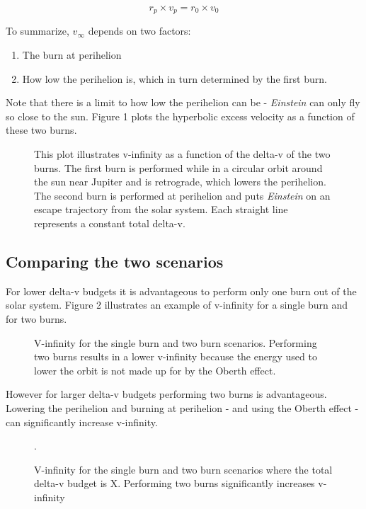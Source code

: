 \documentclass[12pt]{article} %
\begin{document}
$$r_p \times v_p = r_0 \times v_0$$

To summarize, $v_{\infty}$ depends on two factors: 

\begin{enumerate}
\item The burn at perihelion
\item How low the perihelion is, which in turn determined by the first burn. 
\end{enumerate}

Note that there is a limit to how low the perihelion can be - \textit{Einstein} can only fly so close to the sun. Figure 1 plots the hyperbolic excess velocity as a function of these two burns.

\begin{figure}[H]
\caption{This plot illustrates v-infinity as a function of the delta-v of the two burns. The first burn is performed while in a circular orbit around the sun near Jupiter and is retrograde, which lowers the perihelion. The second burn is performed at perihelion and puts \textit{Einstein} on an escape trajectory from the solar system. Each straight line represents a constant total delta-v.}
\end{figure}

\subsection{Comparing the two scenarios}

For lower delta-v budgets it is advantageous to perform only one burn out of the solar system. Figure 2 illustrates an example of v-infinity for a single burn and for two burns.

\begin{figure}[H]

\caption{V-infinity for the single burn and two burn scenarios. Performing two burns results in a lower v-infinity because the energy used to lower the orbit is not made up for by the Oberth effect.}
\end{figure}

However for larger delta-v budgets performing two burns is advantageous. Lowering the perihelion and burning at perihelion - and using the Oberth effect - can significantly increase v-infinity.

\begin{figure}[H]
\caption{V-infinity for the single burn and two burn scenarios where the total delta-v budget is X. Performing two burns significantly increases v-infinity}.
\end{figure}
\end{document}

